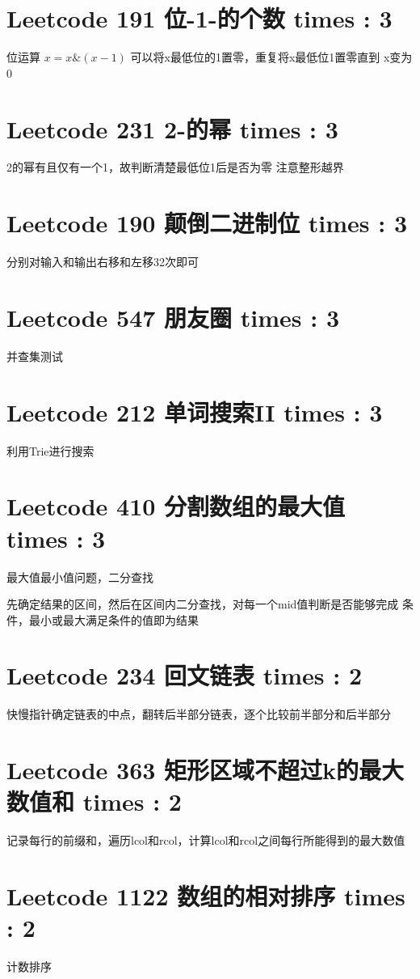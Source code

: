 \documentclass[UTF8]{ctexart}
\begin{document}
\section{Leetcode 191 位-1-的个数 times : 3}
位运算 $x = x\&(x - 1)$ 可以将x最低位的1置零，重复将x最低位1置零直到
x变为0


\section{Leetcode 231 2-的幂 times : 3}
2的幂有且仅有一个1，故判断清楚最低位1后是否为零
注意整形越界

\section{Leetcode 190 颠倒二进制位 times : 3}
分别对输入和输出右移和左移32次即可

\section{Leetcode 547 朋友圈 times : 3}
并查集测试

\section{Leetcode 212 单词搜索II times : 3}
利用Trie进行搜索

\section{Leetcode 410 分割数组的最大值 times : 3}
最大值最小值问题，二分查找

先确定结果的区间，然后在区间内二分查找，对每一个mid值判断是否能够完成
条件，最小或最大满足条件的值即为结果

\section{Leetcode 234 回文链表 times : 2}
快慢指针确定链表的中点，翻转后半部分链表，逐个比较前半部分和后半部分

\section{Leetcode 363 矩形区域不超过k的最大数值和 times : 2}
记录每行的前缀和，遍历lcol和rcol，计算lcol和rcol之间每行所能得到的最大数值

\section{Leetcode 1122 数组的相对排序 times : 2}
计数排序
\end{document}
